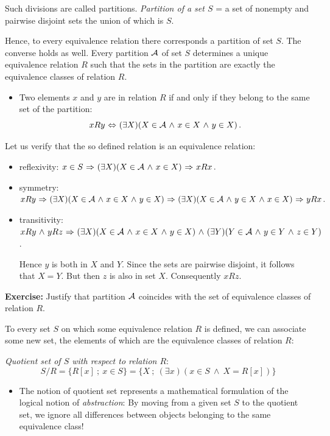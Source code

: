 \documentclass[11pt,paper=b5,footinclude,headinclude]{scrbook} %
\def\inn {{~\wedge~}}
\def\sledi {{~\Rightarrow~}}
\def\cee {{~\Leftrightarrow~}}
\theoremstyle{remark}
\theoremstyle{definition} %
\theoremstyle{theorem} %
\begin{document}
Such divisions are called partitions. {\em Partition of a set $S$} = a set of nonempty and pairwise disjoint sets the union of which is $S$.

Hence, to every equivalence relation there corresponds a partition of set $S$.
The converse holds as well. Every partition ${\cal A}$ of set $S$ determines a unique equivalence relation $R$
such that the sets in the partition are exactly the equivalence classes of relation $R$.
\begin{itemize}
  \item Two elements $x$ and $y$ are in relation $R$ if and only if they belong to the same set of the partition:
      $$xRy\cee (\exists X)(X\in {\cal A}\inn x\in X\inn y\in X)\,.$$
\end{itemize}
Let us verify that the so defined relation is an equivalence relation:
\begin{itemize}
  \item reflexivity: $x\in S \sledi (\exists X)(X\in {\cal A}\inn x\in X)\sledi xRx\,.$
  \item symmetry:
  $xRy\sledi (\exists X)(X\in {\cal A}\inn x\in X\inn y\in X)
  \sledi (\exists X)(X\in {\cal A}\inn y\in X\inn x\in X)\sledi yRx\,.$
  \item transitivity:
  $xRy \inn yRz\sledi (\exists X)(X\in {\cal A}\inn x\in X\inn y\in X)
  \inn (\exists Y)(Y\in {\cal A}\inn y\in Y\inn z\in Y)$.

  Hence $y$ is both in $X$ and $Y$. Since the sets are pairwise disjoint, it follows that
  $X = Y$. But then $z$ is also in set $X$. Consequently $xRz$.
\end{itemize}

\textbf{ Exercise:} Justify that partition ${\cal A}$ coincides with the set of equivalence classes of relation $R$.

\bigskip


To every set $S$ on which some equivalence relation $R$ is defined, we can associate some new set, the elements of which are the equivalence classes of relation $R$:

{\em Quotient set of $S$ with respect to relation $R$}:
$$S/R = \{R[x]~;~x\in S\}=\{X~;~(\exists x)(x\in S \inn X = R[x])\}$$
\begin{itemize}
  \item The notion of quotient set represents a mathematical formulation of the logical notion of {\em abstraction}:
  By moving from a given set $S$ to the quotient set, we ignore all differences between objects belonging to the same equivalence class!
\end{itemize}
\end{document}

